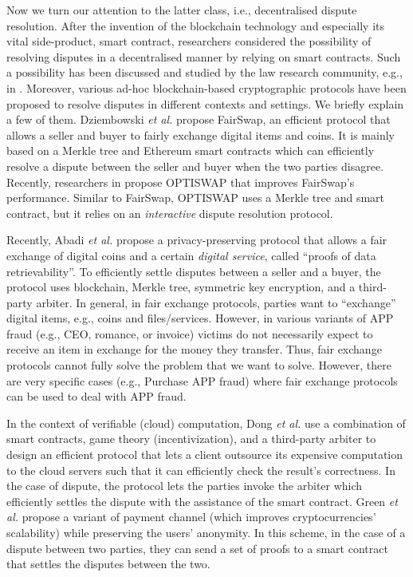 Now we turn our attention to the latter class, i.e., decentralised dispute resolution. After the invention of the blockchain technology and especially its vital side-product, smart contract, researchers considered the possibility of resolving disputes in a decentralised manner by relying on smart contracts. Such a possibility has been discussed and studied by the law research community, e.g., in \cite{buchwald2019smart,ortolani2016self,ortolani2019impact}. Moreover,  various ad-hoc blockchain-based cryptographic protocols have been proposed to resolve disputes in different contexts and settings. We briefly explain a few of them. Dziembowski \textit{et al.}  \cite{DziembowskiEF18} propose FairSwap, an efficient protocol that allows a seller and buyer to fairly exchange digital items and coins. It is mainly based on a Merkle tree and Ethereum smart contracts which can efficiently resolve a dispute between the seller and buyer when the two parties disagree. Recently, researchers in  \cite{EckeyFS20} propose OPTISWAP that improves FairSwap’s performance. Similar to FairSwap, OPTISWAP uses a Merkle tree and smart contract, but it relies on an \emph{interactive} dispute resolution protocol. 

Recently, Abadi \textit{et al.} \cite{AbadiMZ21a} propose a privacy-preserving protocol that allows a  fair exchange of digital coins and a certain \emph{digital service}, called ``proofs of data retrievability''. To efficiently settle disputes between a seller and a buyer, the protocol uses blockchain, Merkle tree, symmetric key encryption, and a  third-party arbiter. In general, in fair exchange protocols, parties want to ``exchange'' digital items, e.g., coins and files/services. However, in various variants of APP fraud (e.g., CEO, romance, or invoice) victims do not necessarily expect to receive an item in exchange for the money they transfer. Thus, fair exchange protocols cannot fully solve the problem that we want to solve. However, there are very specific cases (e.g., Purchase APP fraud) where fair exchange protocols can be used to deal with APP fraud. 

In the context of verifiable (cloud) computation, Dong \textit{et al.} \cite{DongWAMM17} use a combination of smart contracts, game theory (incentivization), and a   third-party arbiter to design an efficient protocol that lets a client outsource its expensive computation to the cloud servers such that it can efficiently check the result's correctness. In the case of dispute, the protocol lets the parties invoke the  arbiter which efficiently settles the dispute with the assistance of the smart contract. Green \textit{et al.} \cite{Bolt} propose a variant  of  payment channel \cite{Lightning-Network} (which improves cryptocurrencies' scalability) while preserving the users' anonymity. In this scheme, in the case of a dispute between two parties, they can send a set of proofs to a smart contract that settles the disputes between the two. 









